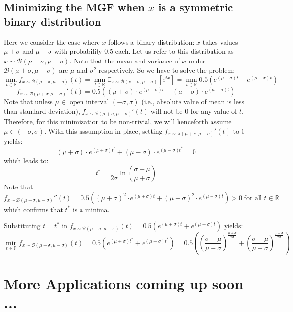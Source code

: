 \documentclass[10pt]{amsart}
\begin{document}
\subsection{Minimizing the MGF when $x$ is a symmetric binary distribution}
Here we consider the case where $x$ follows a binary distribution: $x$ takes values $\mu + \sigma$ and $\mu - \sigma$ with probability 0.5 each. Let us refer to this distribution as $x \sim \mathcal{B}(\mu + \sigma, \mu - \sigma)$. Note that the mean and variance of $x$ under $\mathcal{B}(\mu + \sigma, \mu - \sigma)$ are $\mu$ and $\sigma^2$ respectively. So we have to solve the problem:
$$\min_{t\in \mathbb{R}} f_{x\sim \mathcal{B}(\mu + \sigma, \mu - \sigma)}(t) = \min_{t\in \mathbb{R}} \mathbb{E}_{x\sim \mathcal{B}(\mu + \sigma, \mu - \sigma)}[e^{tx}] = \min_{t\in \mathbb{R}} 0.5(e^{(\mu + \sigma)t} + e^{(\mu - \sigma)t})$$
$$f_{x\sim \mathcal{B}(\mu + \sigma, \mu - \sigma)}'(t) = 0.5((\mu + \sigma) \cdot e^{(\mu + \sigma)t} + (\mu - \sigma) \cdot e^{(\mu - \sigma)t})$$
Note that unless $\mu \in \mbox{ open interval } (-\sigma, \sigma) $ (i.e., absolute value of mean is less than standard deviation), $f_{x\sim \mathcal{B}(\mu + \sigma, \mu - \sigma)}'(t)$ will not be 0 for any value of $t$. Therefore, for this minimization to be non-trivial, we will henceforth assume $\mu \in (-\sigma, \sigma)$.
With this assumption in place, setting $f_{x\sim \mathcal{B}(\mu + \sigma, \mu - \sigma)}'(t)$ to 0 yields:
$$(\mu + \sigma) \cdot e^{(\mu + \sigma)t^*} + (\mu - \sigma) \cdot e^{(\mu - \sigma)t^*} = 0$$
which leads to:
\begin{equation}
t^* = \frac 1 {2\sigma} \ln{(\frac {\sigma - \mu} {\mu + \sigma})}
\end{equation}
Note that
$$f_{x\sim \mathcal{B}(\mu + \sigma, \mu - \sigma)}''(t) =  0.5((\mu + \sigma)^2 \cdot e^{(\mu + \sigma)t} + (\mu - \sigma)^2 \cdot e^{(\mu - \sigma)t}) > 0 \mbox{ for all } t \in \mathbb{R}$$
which confirms that $t^*$ is a minima.

Substituting $t=t^*$ in $f_{x\sim \mathcal{B}(\mu + \sigma, \mu - \sigma)}(t) = 0.5(e^{(\mu + \sigma)t} + e^{(\mu - \sigma)t})$ yields:
\begin{equation}
\min_{t\in \mathbb{R}} f_{x\sim \mathcal{B}(\mu + \sigma, \mu - \sigma)}(t) = 0.5(e^{(\mu + \sigma)t^*} + e^{(\mu - \sigma)t^*}) = 0.5((\frac {\sigma - \mu} {\mu+ \sigma})^{\frac {\mu + \sigma} {2\sigma}} + (\frac {\sigma - \mu} {\mu+ \sigma})^{\frac {\mu - \sigma} {2\sigma}})
\end{equation}


\section{More Applications coming up soon ...}
\end{document}
